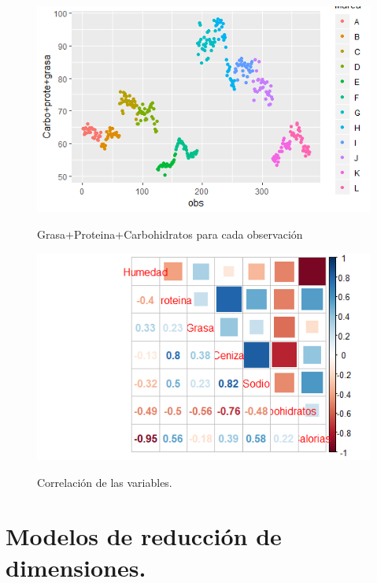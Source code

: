 \documentclass[pdf]{beamer}
\begin{document}
\begin{frame}
\begin{figure}[h]
\centering
\includegraphics[scale=1]{images/pgc.png} 
\label{i10}
\caption{Grasa+Proteina+Carbohidratos para cada observación}
\end{figure}
\end{frame}


\begin{frame}
\begin{figure}[h]
\centering
\includegraphics[scale=1]{images/corr.png} 
\label{i11}
\caption{Correlación de las variables.}
\end{figure}
\end{frame}

\begin{frame}

\end{frame}


\section{Modelos de reducción de dimensiones.}
\end{document}
